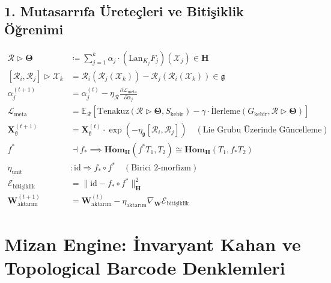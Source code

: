 \documentclass[11pt, a4paper]{article}
\begin{document}
\subsection{1. Mutasarrıfa Üreteçleri ve Bitişiklik Öğrenimi}
\begin{align}
\mathcal{R} \triangleright \mathbf{\Theta} &\coloneqq \sum_{j=1}^k \alpha_j \cdot (\text{Lan}_{K_j} F_j)(\mathcal{X}_j) \in \mathbf{H} \\
[\mathcal{R}_i, \mathcal{R}_j] \triangleright \mathcal{X}_k &= \mathcal{R}_i(\mathcal{R}_j(\mathcal{X}_k)) - \mathcal{R}_j(\mathcal{R}_i(\mathcal{X}_k)) \in \mathfrak{g} \\
\alpha_j^{(t+1)} &= \alpha_j^{(t)} - \eta_{\mathcal{R}} \frac{\partial \mathcal{L}_{\text{meta}}}{\partial \alpha_j} \\
\mathcal{L}_{\text{meta}} &= \mathbb{E}_{\mathcal{R}} \left[ \text{Tenakuz}(\mathcal{R} \triangleright \mathbf{\Theta}, S_{\text{kebîr}}) - \gamma \cdot \text{İlerleme}(G_{\text{kebîr}}, \mathcal{R} \triangleright \mathbf{\Theta}) \right] \\
\mathbf{X}_{\mathfrak{g}}^{(t+1)} &= \mathbf{X}_{\mathfrak{g}}^{(t)} \cdot \exp\left( -\eta_{\mathfrak{g}} [\mathcal{R}_i, \mathcal{R}_j] \right) \quad (\text{Lie Grubu Üzerinde Güncelleme}) \\
f^* &\dashv f_* \implies \mathbf{Hom}_{\mathbf{H}}(f^* T_1, T_2) \cong \mathbf{Hom}_{\mathbf{H}}(T_1, f_* T_2) \\
\eta_{\text{unit}} &: \text{id} \Longrightarrow f_* \circ f^* \quad (\text{Birici 2-morfizm}) \\
\mathcal{E}_{\text{bitişiklik}} &= \| \text{id} - f_* \circ f^* \|_{\mathbf{H}}^2 \\
\mathbf{W}_{\text{aktarım}}^{(t+1)} &= \mathbf{W}_{\text{aktarım}}^{(t)} - \eta_{\text{aktarım}} \nabla_{\mathbf{W}} \mathcal{E}_{\text{bitişiklik}}
\end{align}

\section{Mizan Engine: İnvaryant Kahan ve Topological Barcode Denklemleri}
\end{document}
